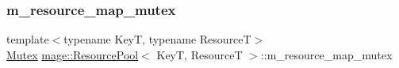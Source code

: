 \hypertarget{classmage_1_1_resource_pool_a5857b70ac755db750dcaff5277201f9f}{}\label{classmage_1_1_resource_pool_a5857b70ac755db750dcaff5277201f9f} 
\subsubsection{\texorpdfstring{m\+\_\+resource\+\_\+map\+\_\+mutex}{m\_resource\_map\_mutex}}
{\footnotesize\ttfamily template$<$typename KeyT, typename ResourceT$>$ \\
\hyperlink{classmage_1_1_mutex}{Mutex} \hyperlink{classmage_1_1_resource_pool}{mage\+::\+Resource\+Pool}$<$ KeyT, ResourceT $>$\+::m\+\_\+resource\+\_\+map\+\_\+mutex\hspace{0.3cm}{\ttfamily [private]}}

